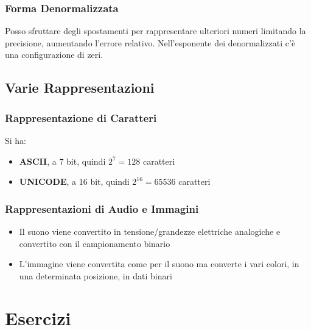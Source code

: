 \documentclass[a4paper,12pt, oneside]{book}
\begin{document}
\subsubsection{Forma Denormalizzata}
Posso sfruttare degli spostamenti per rappresentare ulteriori numeri limitando la precisione, aumentando l'errore relativo. Nell'esponente dei denormalizzati c'è una configurazione di zeri.
\subsection{Varie Rappresentazioni}
\subsubsection{Rappresentazione di Caratteri}
Si ha:
\begin{itemize}
\item \textbf{ASCII}, a 7 bit, quindi $2^7=128$ caratteri
\item \textbf{UNICODE}, a 16 bit, quindi $2^{16}=65536$ caratteri
\end{itemize}
\subsubsection{Rappresentazioni di Audio e Immagini}
\begin{itemize}
\item Il suono viene convertito in tensione/grandezze elettriche analogiche e convertito con il campionamento binario
\item L'immagine viene convertita come per il suono ma converte i vari colori, in una determinata posizione, in dati binari
\end{itemize}
\newpage
\section{Esercizi}
\end{document}
